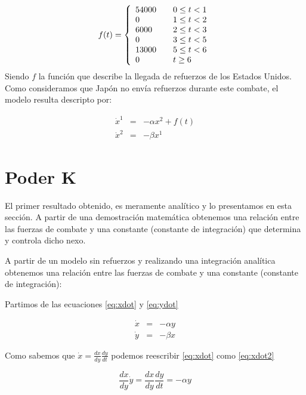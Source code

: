 \documentclass{sig-alternate}
\begin{document}
\begin{equation}
f(t) = \left\{ 
    \begin{array}{l l}
    54000 & \quad 0 \leq t < 1 \\
    0 & \quad 1 \leq t < 2\\
    6000 & \quad 2 \leq t < 3\\
    0 & \quad 3 \leq t < 5\\
    13000 & \quad 5 \leq t < 6\\
    0 & \quad t \geq 6\\
    \end{array} \right.
\end{equation}
Siendo $f$ la función que describe la llegada de refuerzos de los Estados Unidos. Como consideramos que Japón no envía refuerzos durante este
combate, el modelo resulta descripto por:


\begin{eqnarray}
\dot{x}^1 &=& -\alpha x^2 + f(t)                              \\
\dot{x}^2 &=& -\beta x^1
\end{eqnarray}


\section{Poder K}
\label{sec:kirchner}
El primer resultado obtenido, es meramente analítico y lo presentamos en esta sección. A partir de una demostración matemática
obtenemos una relación entre las fuerzas de combate y una constante (constante de integración) que determina y controla dicho nexo. 

A partir de un modelo sin refuerzos y realizando una integración analítica obtenemos una relación entre las fuerzas de combate y una constante (constante de integración):

Partimos de las ecuaciones \eqref{eq:xdot} y \eqref{eq:ydot}

\begin{eqnarray}
\dot{x} & = & -\alpha y\label{eq:xdot}\\
\dot{y} & = & -\beta x\label{eq:ydot}
\end{eqnarray}

Como sabemos que $\dot{x}=\frac{dx}{dy}\frac{dy}{dt}$ podemos reescribir \eqref{eq:xdot} como \eqref{eq:xdot2}

\begin{equation}
\frac{dx}{dy}\dot{y}=\frac{dx}{dy}\frac{dy}{dt}=-\alpha y
\label{eq:xdot2}
\end{equation}
\end{document}
